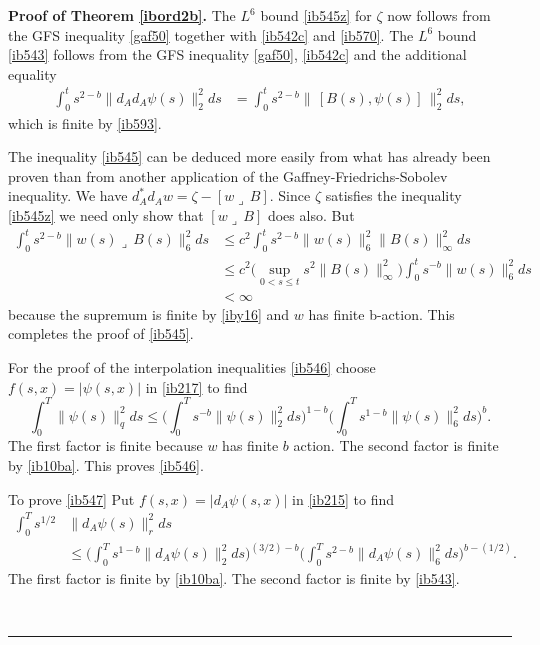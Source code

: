 \documentclass[12pt]{article}
\newenvironment{proof}[1][Proof]{\textbf{#1.} }{\ \rule{0.5em}{0.5em}}
\def \beq{\begin{equation}}
\def \eeq{\end{equation}}
\def \eref{\eqref}
\def \lrc{\lrcorner\,}
\numberwithin{equation}{section}
\begin{document}
\begin{proof}[Proof of Theorem \ref{ibord2b}]
The $L^6$ bound \eref{ib545z} for $\zeta$ now follows from the GFS inequality \eref{gaf50} together
 with \eref{ib542c} and \eref{ib570}. The $L^6$ bound \eref{ib543} follows from 
 the GFS inequality \eref{gaf50}, \eref{ib542c} and the additional equality 
    \begin{align}
   \int_0^t s^{2-b} \| d_A d_A \psi(s)\|_2^2 ds &=\int_0^t s^{2-b} \|\, [B(s), \psi(s)]\,\|_2^2 ds,  
     \label{ib568}
   \end{align}
   which is finite by \eref{ib593}.
   
   The inequality \eref{ib545} can be deduced more easily from  what has already been proven
        than from another  application of the Gaffney-Friedrichs-Sobolev inequality.  
        We have $d_A^* d_Aw = \zeta - [w\lrc B]$. Since $\zeta$ satisfies the inequality \eref{ib545z} we need
        only show that $[w\lrc B]$ does also. But
          \begin{align}
        \int_0^t s^{2-b}\| w(s) \lrc B(s) \|_6^2 ds  &\le
        c^2\int_0^t s^{2-b} \| w(s)\|_6^2 \| B(s)\|_\infty^2 ds \\
        &\le   c^2 \Big(\sup_{0 < s \le t} s^2\|B(s)\|_\infty^2 \Big)
        \int_0^t s^{-b} \| w(s)\|_6^2 ds \\
        &<\infty
            \end{align}
        because the supremum is finite by \eref{iby16} and $w$ has finite b-action.
            This completes the proof of \eref{ib545}.

  
        For the proof of the interpolation inequalities \eref{ib546} choose 
        $f(s,x) = | \psi(s,x)|$ in \eref{ib217} to find
        \beq
        \int_0^T \|\psi(s)\|_q^2 ds \le \Big(\int_0^T s^{-b} \|\psi(s)\|_2^2 ds\Big)^{1-b}
        \Big(\int_0^T s^{1-b} \| \psi(s)\|_6^2 ds \Big)^b.
        \eeq
         The first factor is finite because $w$ has
        finite $b$ action. The second factor is finite by \eref{ib10ba}. This proves \eref{ib546}.
        
        To prove \eref{ib547}  Put $f(s, x) = |d_A\psi(s, x)|$ in \eref{ib215} to find 
        \begin{align*}
        \int_0^T s^{1/2} &\|d_A \psi(s)\|_r^2 ds \\
        & \le \Big(\int_0^T s^{1-b} \|d_A \psi(s)\|_2^2 ds\Big)^{(3/2)-b}
       \Big(\int_0^T s^{2-b} \|d_A \psi(s)\|_6^2 ds\Big)^{b - (1/2)} .
       \end{align*}
       The first factor is finite by \eref{ib10ba}. The second factor is finite by \eref{ib543}.
            

\end{proof}
\end{document}
